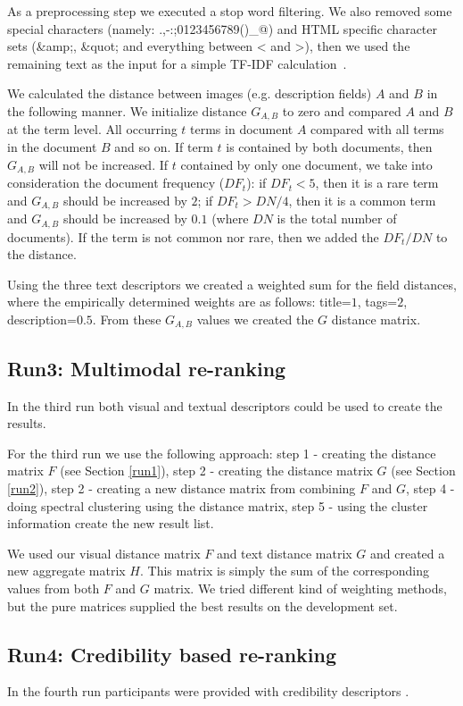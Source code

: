 \documentclass{acm_proc_article-me}
\begin{document}
As a preprocessing step we executed a stop word filtering. We also removed some special characters (namely: .,-:;0123456789()\_@) and HTML specific character sets (\&amp;, \&quot; and everything between < and >), then we used the remaining text as the input for a simple TF-IDF calculation~\cite{Yeh2008}. 

We calculated the distance between images (e.g. description fields) $A$ and $B$ in the following manner. We initialize distance $G_{A,B}$ to zero and compared $A$ and $B$ at the term level. All occurring $t$ terms in document $A$ compared with all terms in the document $B$ and so on. If term $t$ is contained by both documents, then $G_{A,B}$ will not be increased. If $t$ contained by only one document, we take into consideration the document frequency ($DF_t$): if $DF_t<5$, then it is a rare term and $G_{A,B}$ should be increased by $2$; if $DF_t>DN/4$, then it is a common term and  $G_{A,B}$ should be increased by $0.1$ (where $DN$ is the total number of documents). If the term is not common nor rare, then we added the $DF_t/DN$ to the distance. 
 
Using the three text descriptors we created a weighted sum for the field distances, where the empirically determined weights are as follows: title=$1$, tags=$2$, description=$0.5$. From these $G_{A,B}$ values we created the $G$ distance matrix.

\subsection{Run3: Multimodal re-ranking}
In the third run both visual and textual descriptors could be used to create the results.

For the third run we use the following approach: step 1 - creating the distance matrix $F$ (see Section \ref{run1}), step 2 - creating the distance matrix $G$ (see Section \ref{run2}), step 2 - creating a new distance matrix from combining $F$ and $G$, step 4 - doing spectral clustering using the distance matrix, step 5 - using the cluster information create the new result list.

We used our visual distance matrix $F$ and text distance matrix $G$  and created a new aggregate matrix $H$. This matrix is simply the sum of the corresponding values from both $F$ and $G$ matrix. We tried different kind of weighting methods, but the pure matrices supplied the best results on the development set.

\subsection{Run4: Credibility based re-ranking}
In the fourth run participants were provided with credibility descriptors \cite{Task2015}.
\end{document}
